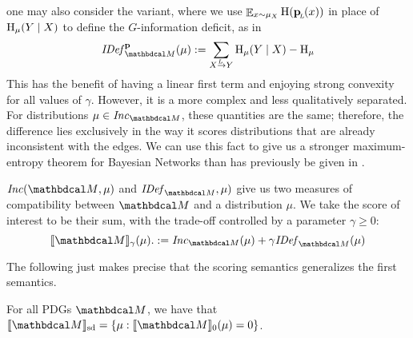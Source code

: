 \documentclass{article}
\newcommand{\bp}[1][L]{\mathbf{p}_{\!_#1\!}}
\newcommand{\ed}[3]{#2
	\overset{\smash{\mskip-5mu\raisebox{-1pt}{$\scriptscriptstyle
				#1$}}}{\rightarrow} #3}
\newcommand{\alle}[1][L]{_{ \ed {#1}XY}}
\newcommand{\dg}[1]{\mathbdcal #1}
\DeclarePairedDelimiter{\SD}{\llbracket}{\rrbracket_{\text{sd}}}
\newcommand{\IDef}[1]{\mathit{IDef}_{#1}}
\newcommand\Inc{\mathit{Inc}}
\newcommand{\begthm}[2]{\begin{#1}[restate=#2,label=#2]}
\begin{document}
	\begin{remark}
	 	one may also consider the variant, where we use $\E_{x \sim \mu_X} \H (\bp (x))$ in place of $\mathrm{H}_\mu(Y \mid X)$ to define the $G$-information deficit, as in 
		\begin{equation}
			\IDef{\dg M}^{\mat p}(\mu) := \sum\alle \H_\mu(Y\mid X) - \H_\mu
			\label{eqn:alt-extra}
		\end{equation}
		This has the benefit of having a linear first term and enjoying strong convexity for all values of $\gamma$. However, it is a more complex and less qualitatively separated. For distributions $\mu \in \Inc_{\dg M}$, these quantities are the same; therefore, the difference lies exclusively in the way it scores distributions that are already inconsistent with the edges.
		We can use this fact to give us a stronger maximum-entropy theorem for Bayesian Networks than has previously be given in \cite{williamson2000}.
	\end{remark}
	
	
	
	$\Inc({\dg M}, \mu)$ and $\IDef{\dg M},\mu)$ give us two measures
	of compatibility between ${\dg M}$ and a distribution $\mu$.
	We take the score of interest to be their sum, with the trade-off
	controlled by a parameter $\gamma \ge 0$:
	\begin{equation}
		\bbr{\dg M}_\gamma(\mu).
		:= \Inc_{\dg M}(\mu) + \gamma \IDef{\dg M}(\mu)
		\label{eqn:full-score}
	\end{equation}
	
	The following just makes precise that the scoring semantics
	generalizes the first semantics.
	\begthm{prop}{prop:sd-is-zeroset}
	For all PDGs $\dg M$, we have that $\SD{\dg M} = \{ \mu : \bbr{\dg
		M}_0(\mu) = 0\}$. 
\end{prop}
\end{document}
